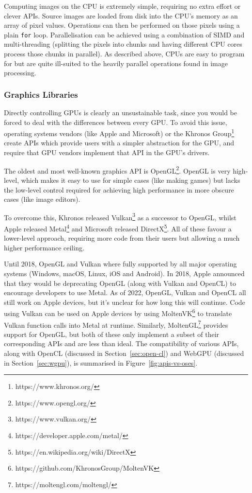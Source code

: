 \documentclass[12pt]{article}
\begin{document}
Computing images on the CPU is extremely simple, requiring no extra effort or clever APIs.  Source
images are loaded from disk into the CPU's memory as an array of pixel values.  Operations can then
be performed on those pixels using a plain \verb|for| loop.  Parallelisation can be achieved
using a combination of SIMD and multi-threading (splitting the pixels into chunks and having
different CPU cores process those chunks in parallel).  As described above, CPUs are easy to program
for but are quite ill-suited to the heavily parallel operations found in image processing.

\subsubsection{Graphics Libraries}

Directly controlling GPUs is clearly an unsustainable task, since you would be forced to deal with
the differences between every GPU.  To avoid this issue, operating systems vendors (like Apple and
Microsoft) or the Khronos Group\footnote{https://www.khronos.org/} create APIs which provide users
with a simpler abstraction for the GPU, and require that GPU vendors implement that API in the GPU's
drivers.

The oldest and most well-known graphics API is OpenGL\footnote{https://www.opengl.org/}.  OpenGL is
very high-level, which makes it easy to use for simple cases (like making games) but lacks the
low-level control required for achieving high performance in more obscure cases (like image
editors).

To overcome this, Khronos released Vulkan\footnote{https://www.vulkan.org/} as a successor to
OpenGL, whilst Apple released Metal\footnote{https://developer.apple.com/metal/} and Microsoft
released DirectX\footnote{https://en.wikipedia.org/wiki/DirectX}.  All of these favour a lower-level
approach, requiring more code from their users but allowing a much higher performance ceiling.

Until 2018, OpenGL and Vulkan where fully supported by all major operating systems (Windows, macOS,
Linux, iOS and Android).  In 2018, Apple announced that they would be deprecating OpenGL (along with
Vulkan and OpenCL) to encourage developers to use Metal.  As of 2022, OpenGL, Vulkan and OpenCL all
still work on Apple devices, but it's unclear for how long this will continue.  Code using Vulkan
can be used on Apple devices by using MoltenVK\footnote{https://github.com/KhronosGroup/MoltenVK} to
translate Vulkan function calls into Metal at runtime.  Similarly,
MoltenGL\footnote{https://moltengl.com/moltengl/} provides support for OpenGL, but both of these
only implement a subset of their corresponding APIs and are less than ideal.  The compatibility of
various APIs, along with OpenCL (discussed in Section~\ref{sec:open-cl}) and WebGPU (discussed in
Section~\ref{sec:wgpu}), is summarised in Figure~\ref{fig:apis-vs-oses}.
\end{document}
